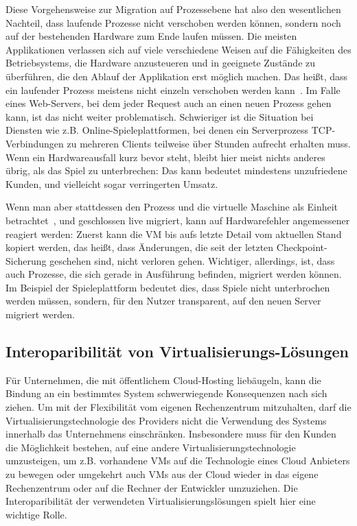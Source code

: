 Diese Vorgehensweise zur Migration auf Prozessebene hat also den
wesentlichen Nachteil, dass laufende Prozesse nicht verschoben werden
können, sondern noch auf der bestehenden Hardware zum Ende laufen
müssen. Die meisten Applikationen verlassen sich auf viele
verschiedene Weisen auf die Fähigkeiten des Betriebsystems, die
Hardware anzusteueren und in geeignete Zustände zu überführen, die den
Ablauf der Applikation erst möglich machen. Das heißt, dass ein
laufender Prozess meistens nicht einzeln verschoben werden
kann~\cite{hansen2002nomadic}. Im Falle eines Web-Servers, bei dem
jeder Request auch an einen neuen Prozess gehen kann, ist das nicht
weiter problematisch. Schwieriger ist die Situation bei Diensten wie
z.B. Online-Spieleplattformen, bei denen ein Serverprozess
TCP-Verbindungen zu mehreren Clients teilweise über Stunden aufrecht
erhalten muss. Wenn ein Hardwareausfall kurz bevor steht, bleibt hier
meist nichts anderes übrig, als das Spiel zu unterbrechen: Das kann
bedeutet mindestens unzufriedene Kunden, und vielleicht sogar
verringerten Umsatz.

Wenn man aber stattdessen den Prozess und die virtuelle Maschine als
Einheit betrachtet~\cite{nelson2005fast}, und geschlossen live
migriert, kann auf Hardwarefehler angemessener reagiert werden: Zuerst
kann die VM bis aufs letzte Detail vom aktuellen Stand kopiert werden,
das heißt, dass Änderungen, die seit der letzten Checkpoint-Sicherung
geschehen sind, nicht verloren gehen. Wichtiger, allerdings, ist, dass
auch Prozesse, die sich gerade in Ausführung befinden, migriert werden
können. Im Beispiel der Spieleplattform bedeutet dies, dass Spiele
nicht unterbrochen werden müssen, sondern, für den Nutzer transparent,
auf den neuen Server migriert werden.

\subsection{Interoparibilität von Virtualisierungs-Lösungen}
Für Unternehmen, die mit öffentlichem Cloud-Hosting liebäugeln, kann
die Bindung an ein bestimmtes System schwerwiegende Konsequenzen nach
sich ziehen. Um mit der Flexibilität vom eigenen Rechenzentrum
mitzuhalten, darf die Virtualisierungstechnologie des Providers nicht
die Verwendung des Systems innerhalb das Unternehmens
einschränken. Insbesondere muss für den Kunden die Möglichkeit
bestehen, auf eine andere Virtualisierungstechnologie umzusteigen, um
z.B. vorhandene VMs auf die Technologie eines Cloud Anbieters zu
bewegen oder umgekehrt auch VMs aus der Cloud wieder in das eigene
Rechenzentrum oder auf die Rechner der Entwickler umzuziehen. Die
Interoparibilität der verwendeten Virtualisierungslösungen spielt hier
eine wichtige Rolle.

